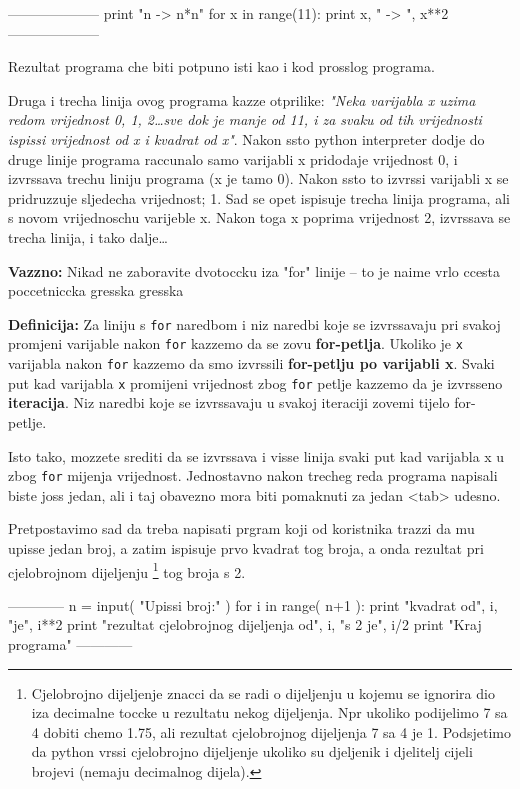 --------------------
print "n -> n*n"
for x in range(11):
	print x, " -> ", x**2
--------------------

Rezultat programa che biti potpuno isti kao i kod prosslog programa.

Druga i trecha linija ovog programa kazze otprilike: \emph{"Neka
varijabla x uzima redom vrijednost 0, 1, 2\dots sve dok je manje
od 11, i za svaku od tih vrijednosti ispissi vrijednost od x i
kvadrat od x"}. Nakon ssto python interpreter dodje do druge linije
programa raccunalo samo varijabli x pridodaje vrijednost 0, i
izvrssava trechu liniju programa (x je tamo 0). Nakon ssto to
izvrssi varijabli x se pridruzzuje sljedecha vrijednost; 1. Sad se
opet ispisuje trecha linija programa, ali s novom vrijednoschu
varijeble x. Nakon toga x poprima vrijednost 2, izvrssava se trecha
linija, i tako dalje\dots

\textbf{Vazzno:}
Nikad ne zaboravite dvotoccku iza "for" linije -- to je naime vrlo
ccesta poccetniccka gresska gresska

\textbf{Definicija:} Za liniju s \verb"for" naredbom i niz naredbi koje
se izvrssavaju pri svakoj promjeni varijable nakon \verb"for"
kazzemo da se zovu \textbf{for-petlja}. Ukoliko je \verb"x" varijabla
nakon \verb"for" kazzemo da smo izvrssili \textbf{for-petlju po varijabli
x}. Svaki put kad varijabla \verb"x" promijeni vrijednost zbog \verb"for"
petlje kazzemo da je izvrsseno \textbf{iteracija}. Niz naredbi koje se
izvrssavaju u svakoj iteraciji zovemi tijelo for-petlje.

Isto tako, mozzete srediti da se izvrssava i visse linija svaki
put kad varijabla x u zbog \verb"for" mijenja vrijednost. Jednostavno
nakon trecheg reda programa napisali biste joss jedan, ali i taj
obavezno mora biti pomaknuti za jedan <tab> udesno.

Pretpostavimo sad da treba napisati prgram koji od koristnika trazzi
da mu upisse jedan broj, a zatim ispisuje prvo kvadrat tog broja,
a onda rezultat pri cjelobrojnom dijeljenju 
\footnote{
	Cjelobrojno dijeljenje znacci da se radi o dijeljenju u
	kojemu se ignorira dio iza decimalne toccke u rezultatu
	nekog dijeljenja. Npr ukoliko podijelimo 7 sa 4 dobiti
	chemo 1.75, ali rezultat cjelobrojnog dijeljenja 7 sa 4 je
	1. Podsjetimo da python vrssi cjelobrojno dijeljenje ukoliko
	su djeljenik i djelitelj cijeli brojevi (nemaju decimalnog
	dijela).
}
tog broja s 2.

------------
n = input( "Upissi broj:" )
for i in range( n+1 ):
	print "kvadrat od", i, "je", i**2
	print "rezultat cjelobrojnog dijeljenja od", i, "s 2 je", i/2
print "Kraj programa"
------------

